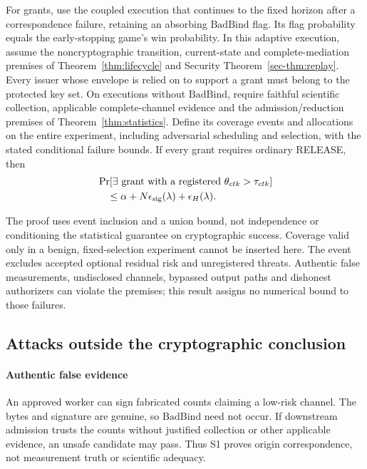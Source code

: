 \begin{securitytheorem}
\label{sec-thm:composition}
For grants, use the coupled execution that continues to the fixed horizon
after a correspondence failure, retaining an absorbing $\mathrm{BadBind}$
flag. Its flag probability equals the early-stopping game's win probability.
In this adaptive execution, assume the noncryptographic transition,
current-state and complete-mediation premises of
Theorem~\ref{thm:lifecycle} and Security Theorem~\ref{sec-thm:replay}.
Every issuer whose envelope is relied on to support a grant must belong
to the protected key set.
On executions without $\mathrm{BadBind}$, require faithful scientific
collection, applicable complete-channel evidence and the admission/reduction
premises of Theorem~\ref{thm:statistics}. Define its coverage events and
allocations on the entire experiment, including adversarial scheduling and
selection, with the stated conditional failure bounds. If every grant
requires ordinary RELEASE, then
\[
 \begin{split}
 &\Pr[\exists\text{ grant with a registered }
                       \theta_{ctk}>\tau_{ctk}]\\
 &\hspace{1em}\le \alpha+
              N\epsilon_{\rm sig}(\lambda)+\epsilon_H(\lambda).
 \end{split}
\]
\end{securitytheorem}
The proof uses event inclusion and a union bound, not independence or
conditioning the statistical guarantee on cryptographic success. Coverage
valid only in a benign, fixed-selection experiment cannot be inserted here.
The event excludes accepted optional residual risk and unregistered threats.
Authentic false measurements, undisclosed channels, bypassed output paths
and dishonest authorizers can violate the premises; this result assigns no
numerical bound to those failures.

\subsection{Attacks outside the cryptographic conclusion}
\label{sec:security-counterexamples}
\paragraph{Authentic false evidence}
An approved worker can sign fabricated counts claiming a low-risk channel.
The bytes and signature are genuine, so $\mathrm{BadBind}$ need not occur.
If downstream admission trusts the counts without justified collection or
other applicable evidence, an unsafe candidate may pass. Thus S1 proves
origin correspondence, not measurement truth or scientific adequacy.

